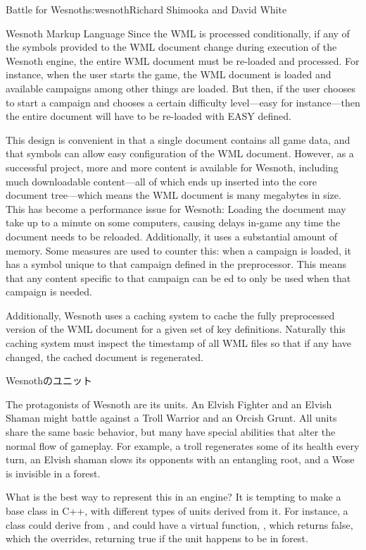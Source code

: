 \begin{aosachapter}{Battle for Wesnoth}{s:wesnoth}{Richard Shimooka and David White}
\begin{aosasect1}{Wesnoth Markup Language}
Since the WML is processed conditionally, if any of the
symbols provided to the WML document change during execution of the
Wesnoth engine, the entire WML document must be re-loaded and
processed. For instance, when the user starts the game, the WML
document is loaded and available campaigns among other things are
loaded. But then, if the user chooses to start a campaign and chooses
a certain difficulty level---easy for instance---then the entire
document will have to be re-loaded with EASY defined.

This design is convenient in that a single document contains all game
data, and that symbols can allow easy configuration of the WML
document. However, as a successful project, more and more content is
available for Wesnoth, including much downloadable content---all of
which ends up inserted into the core document tree---which means the
WML document is many megabytes in size. This has become a performance
issue for Wesnoth: Loading the document may take up to a minute on
some computers, causing delays in-game any time the document needs to
be reloaded. Additionally, it uses a substantial amount of
memory. Some measures are used to counter this: when a campaign is
loaded, it has a symbol unique to that campaign defined in the
preprocessor. This means that any content specific to that campaign
can be ed to only be used when that campaign is needed.

Additionally, Wesnoth uses a caching system to cache the fully
preprocessed version of the WML document for a given set of key
definitions. Naturally this caching system must inspect the timestamp
of all WML files so that if any have changed, the cached document is
regenerated.

\end{aosasect1}

\begin{aosasect1}{Wesnothのユニット}

The protagonists of Wesnoth are its units. An Elvish Fighter and an
Elvish Shaman might battle against a Troll Warrior and an Orcish
Grunt.  All units share the same basic behavior, but many have special
abilities that alter the normal flow of gameplay. For example, a troll
regenerates some of its health every turn, an Elvish shaman slows its
opponents with an entangling root, and a Wose is invisible in a
forest. 

What is the best way to represent this in an engine? It is
tempting to make a base  class in C++, with different types
of units derived from it. For instance, a  class could
derive from , and  could have a virtual
function, , which returns false, which
the  overrides, returning true if the unit happens to
be in forest.


\end{aosasect1}
\end{aosachapter}
